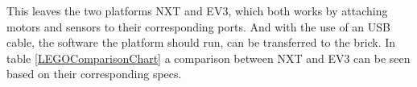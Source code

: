 This leaves the two platforms NXT and EV3, which both works by attaching motors and sensors to their corresponding ports. And with the use of an USB cable, the software the platform should run, can be transferred to the brick. In table \ref{LEGOComparisonChart} a comparison between NXT and EV3 can be seen based on their corresponding specs. 









